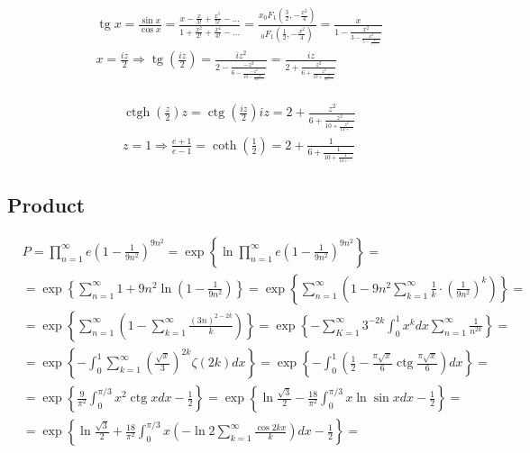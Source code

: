 	$$
	\begin{aligned}
		& \operatorname{tg} x=\frac{\sin x}{\cos x}=\frac{x-\frac{x}{3 !}+\frac{x^5}{5 !}-\ldots}{1+\frac{x^2}{2 !}+\frac{x^4}{4 !}-\ldots}=\frac{x_0 F_1\left(\frac{3}{2},-\frac{x^2}{4}\right)}{{ }_0 F_1\left(\frac{1}{2},-\frac{x^2}{4}\right)}=\frac{x}{1-\frac{x^2}{3-\frac{x^2}{5-\frac{x^2}{7-\cdots}}}} \\
		& x=\frac{i z}{2} \Rightarrow \operatorname{tg}\left(\frac{i z}{2}\right)=\frac{i z^2}{2-\frac{-z^2}{6-\frac{-z^2}{10-\frac{-z^2}{14-\cdots}}}}=\frac{i z}{2+\frac{z^2}{6+\frac{z^2}{10+\frac{z^2}{14-\cdots}}}} \\
		&
	\end{aligned}
	$$
	
	$$
	\begin{aligned}
		& \operatorname{ctgh}\left(\frac{z}{2}\right) z=\operatorname{ctg}\left(\frac{i z}{2}\right) i z=2+\frac{z^2}{6+\frac{z^2}{10+\frac{z^2}{14+\cdots}}} \\
		& z=1 \Rightarrow \frac{e+1}{e-1}=\operatorname{coth}\left(\frac{1}{2}\right)=2+\frac{1}{6+\frac{1}{10+\frac{1}{14+\cdots}}}
	\end{aligned}
	$$
	
	\subsection{Product}
	
	$$
	\begin{aligned}
		& P=\prod_{n=1}^{\infty} e\left(1-\frac{1}{9 n^2}\right)^{9 n^2}=\exp \left\{\ln \prod_{n=1}^{\infty} e\left(1-\frac{1}{9 n^2}\right)^{9 n^2}\right\}= \\
		& =\exp \left\{\sum_{n=1}^{\infty} 1+9 n^2 \ln \left(1-\frac{1}{9 n^2}\right)\right\}=\exp \left\{\sum_{n=1}^{\infty}\left(1-9 n^2 \sum_{k=1}^{\infty} \frac{1}{k} \cdot\left(\frac{1}{9 n^2}\right)^k\right)\right\}= \\
		& =\exp \left\{\sum_{n=1}^{\infty}\left(1-\sum_{k=1}^{\infty} \frac{(3 n)^{2-2 k}}{k}\right)\right\}=\exp \left\{-\sum_{K=1}^{\infty} 3^{-2 k} \int_0^1 x^k d x \sum_{n=1}^{\infty} \frac{1}{n^{2 k}}\right\}= \\
		& =\exp \left\{-\int_0^1 \sum_{k=1}^{\infty}\left(\frac{\sqrt{x}}{3}\right)^{2 k} \zeta(2 k) d x\right\}=\exp \left\{-\int_0^1\left(\frac{1}{2}-\frac{\pi \sqrt{x}}{6} \operatorname{ctg} \frac{\pi \sqrt{x}}{6}\right) d x\right\}= \\
		& =\exp \left\{\frac{9}{\pi^2} \int_0^{\pi / 3} x^2 \operatorname{ctg} x d x-\frac{1}{2}\right\}=\exp \left\{\ln \frac{\sqrt{3}}{2}-\frac{18}{\pi^2} \int_0^{\pi / 3} x \ln \sin x d x-\frac{1}{2}\right\}= \\
		& =\exp \left\{\ln \frac{\sqrt{3}}{2}+\frac{18}{\pi^2} \int_0^{\pi / 3} x\left(-\ln 2 \sum_{k=1}^{\infty} \frac{\cos 2 k x}{k}\right) d x-\frac{1}{2}\right\}= \\
		&
	\end{aligned}
	$$
	
